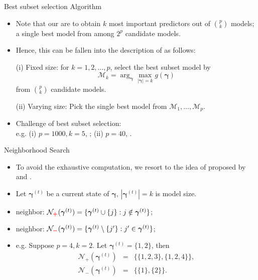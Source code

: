 \documentclass[citecolor=blue,10pt]{beamer}
\def\bg{{\boldsymbol \gamma}}
\newcommand{\0} {\mbox{\boldmath$0$}}
\begin{document}
\begin{frame}{Best subset selection Algorithm}
\begin{itemize}\itemsep=5mm
\item Note that our {\color{red}{goals}} are to obtain {\color{red}{(i)}} $k$ most important predictors out of $\binom{p}{k}$ models; {\color{red}{(ii)}} a single best model from among $2^p$ candidate models.

\item Hence, this can be fallen into the description of {\color{red}{best subset selection}} as follows:
\end{itemize}
\begin{itemize}\itemsep=5mm
\pause
\item[(i)] Fixed size: for $k = 1,2,\ldots,p$,  select the best subset model by
  $$\mathcal{M}_k = \arg_{\bg}\max_{|\bg|=k}g(\bg)$$
from $\binom{p}{k}$ candidate models.
\item [(ii)] Varying size: Pick the single best model from $\mathcal{M}_1,\ldots,\mathcal{M}_p$.
\pause \item Challenge of best subset selection:\\
e.g. (i) $p=1000,k=5$, {}; (ii) $p=40$, {}.
\end{itemize}
\end{frame}
\begin{frame}{Neighborhood Search}
\begin{itemize}
\item To avoid the exhaustive computation, we resort to the idea of {\color{red}{Neighborhood Search}} proposed by \citet{Madigan1995} and \citet{hans2007}.
\item Let $\bg^{(t)}$ be a current state of $\bg$, $|\bg^{(t)}|=k$ is model size.
\item {\color{red}{Addition}} neighbor: $\mathcal{N}_{{\color{red}{\boldsymbol{+}}}} (\bg^{(t)})=\{\bg^{(t)} \cup \{j\}: j\notin \bg^{(t)}\}$; {\color{red}{model size?}} \\ \vspace{3mm}
\item {\color{red}{Deletion}} neighbor: $\mathcal{N}_{{\color{red}{\boldsymbol{-}}}}(\bg^{(t)})=\{\bg^{(t)} \setminus \{j'\}: j'\in \bg^{(t)}\}$; {\color{red}{model size?}}\vspace{3mm}

\item e.g. Suppose $p=4,k=2$. Let $\bg^{(t)} =\{1,2\}$, then
\begin{eqnarray*}
\mathcal{N}_+(\bg^{(t)}) &=& \{\{1,2,3\},\{1,2,4\}\},\\
\mathcal{N}_-(\bg^{(t)})&=& \{\{1\},\{2\}\}.
\end{eqnarray*}
\end{itemize}
\end{frame}
\end{document}
